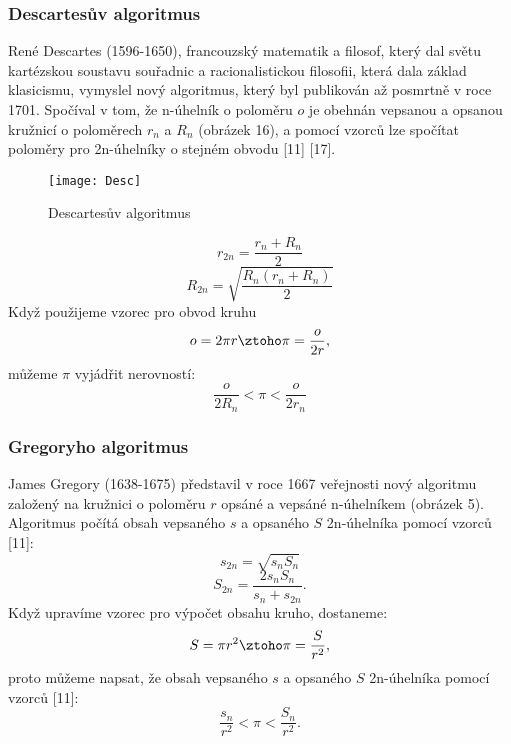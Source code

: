\documentclass[rocnikovka]{gzwroc} %
\begin{document}
\subsubsection{Descartesův algoritmus}
René Descartes (1596-1650), francouzský matematik a filosof, který dal světu kartézskou soustavu souřadnic a racionalistickou filosofii, která dala základ klasicismu, vymyslel nový algoritmus, který byl publikován až posmrtně v roce 1701. Spočíval v tom, že n-úhelník o poloměru $o$ je obehnán vepsanou a opsanou kružnicí o poloměrech $r_n$ a $R_n$ (obrázek 16), a pomocí vzorců lze spočítat poloměry pro 2n-úhelníky o stejném obvodu [11] [17].
\begin{figure}[!ht]
\texttt{[image: Desc]}
\caption{Descartesův algoritmus}
\label{fig:kruh}
\end{figure}
\begin{equation}
r_{2n}=\frac{r_n+R_n}{2}
\end{equation}
\begin{equation}
R_{2n}=\sqrt{\frac{R_n(r_n+R_n)}{2}}
\end{equation}
Když použijeme vzorec pro obvod kruhu
$$
o=2\pi r \ztoho \pi=\frac{o}{2r},
$$
můžeme $\pi$ vyjádřit nerovností:
\begin{equation}
\frac{o}{2R_n}<\pi<\frac{o}{2r_n}
\end{equation}
\subsubsection{Gregoryho algoritmus}
James Gregory (1638-1675) představil v roce 1667 veřejnosti nový algoritmu založený na kružnici o poloměru $r$ opsáné a vepsáné n-úhelníkem (obrázek 5). Algoritmus počítá obsah vepsaného $s$ a opsaného $S$ 2n-úhelníka pomocí vzorců [11]:
\begin{equation}
s_{2n}=\sqrt{s_nS_n}
\end{equation}
\begin{equation}
S_{2n}=\frac{2s_nS_n}{s_n+s_{2n}}.
\end{equation}
Když upravíme vzorec pro výpočet obsahu kruho, dostaneme:
$$
S=\pi r^2 \ztoho \pi=\frac{S}{r^2},
$$
proto můžeme napsat, že
obsah vepsaného $s$ a opsaného $S$ 2n-úhelníka pomocí vzorců [11]:
\begin{equation}
\frac{s_n}{r^2}<\pi<\frac{S_n}{r^2}. 
\end{equation}
\end{document}
